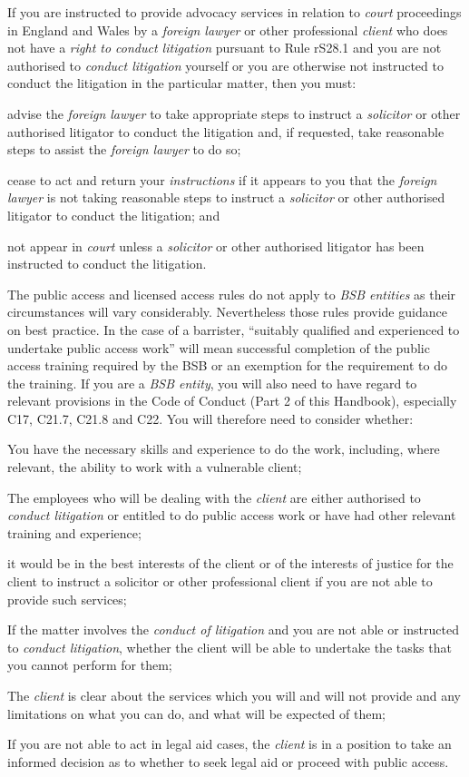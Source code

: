 If you are instructed to provide advocacy services in relation to
\emph{court} proceedings in England and Wales by a \emph{foreign lawyer}
or other professional \emph{client} who does not have a \emph{right to
conduct litigation} pursuant to Rule rS28.1 and you are not authorised
to \emph{conduct litigation} yourself or you are otherwise not
instructed to conduct the litigation in the particular matter, then you
must:\nl\item advise the \emph{foreign lawyer} to take appropriate steps to
instruct a \emph{solicitor} or other authorised litigator to conduct the
litigation and, if requested, take reasonable steps to assist the
\emph{foreign lawyer} to do so;
\item cease to act and return your \emph{instructions} if it appears to you
that the \emph{foreign lawyer} is not taking reasonable steps to
instruct a \emph{solicitor} or other authorised litigator to conduct the
litigation; and
\item not appear in \emph{court} unless a \emph{solicitor} or other
authorised litigator has been instructed to conduct the litigation.
\ln
{}

The public access and licensed access rules do not apply to \emph{BSB
entities} as their circumstances will vary considerably. Nevertheless
those rules provide guidance on best practice. In the case of a
barrister, ``suitably qualified and experienced to undertake public
access work'' will mean successful completion of the public access
training required by the BSB or an exemption for the requirement to do
the training. If you are a \emph{BSB entity}, you will also need to have
regard to relevant provisions in the Code of Conduct (Part 2 of this
Handbook), especially C17, C21.7, C21.8 and C22. You will therefore need
to consider whether:\nl\item You have the necessary skills and experience to do the work,
including, where relevant, the ability to work with a vulnerable client;
\item The employees who will be dealing with the \emph{client} are either
authorised to \emph{conduct litigation} or entitled to do public access
work or have had other relevant training and experience;
\item it would be in the best interests of the client or of the interests
of justice for the client to instruct a solicitor or other professional
client if you are not able to provide such services;
\item If the matter involves the \emph{conduct of litigation} and you are
not able or instructed to \emph{conduct litigation}, whether the client
will be able to undertake the tasks that you cannot perform for them;
\item The \emph{client} is clear about the services which you will and will
not provide and any limitations on what you can do, and what will be
expected of them;
\item If you are not able to act in legal aid cases, the \emph{client} is
in a position to take an informed decision as to whether to seek legal
aid or proceed with public access.
\ln
{}

